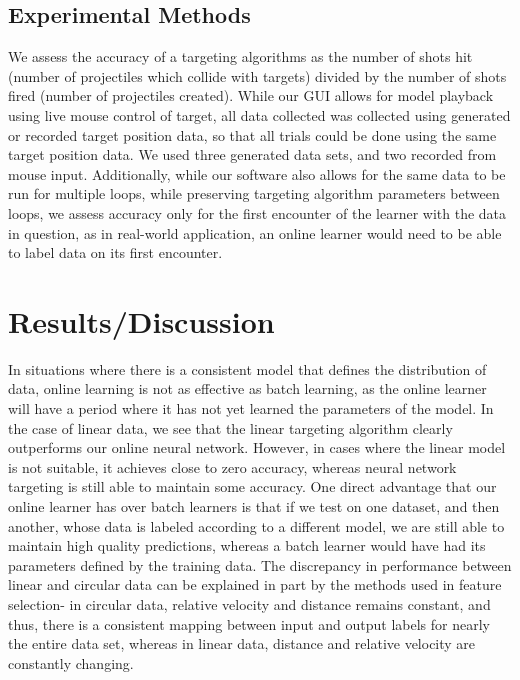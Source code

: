 \documentclass[11pt,letterpaper]{article}
\begin{document}
\subsection{Experimental Methods}
We assess the accuracy of a targeting algorithms as the number of shots hit (number of projectiles which collide with targets) divided by the number of shots fired (number of projectiles created). While our GUI allows for model playback using live mouse control of target, all data collected was collected using generated or recorded target position data, so that all trials could be done using the same target position data. We used three generated data sets, and two recorded from mouse input. Additionally, while our software also allows for the same data to be run for multiple loops, while preserving targeting algorithm parameters between loops, we assess accuracy only for the first encounter of the learner with the data in question, as in real-world application, an online learner would need to be able to label data on its first encounter.

\section{Results/Discussion}
In situations where there is a consistent model that defines the distribution of data, online learning is not as effective as batch learning, as the online learner will have a period where it has not yet learned the parameters of the model. In the case of linear data, we see that the linear targeting algorithm clearly outperforms our online neural network. However, in cases where the linear model is not suitable, it achieves close to zero accuracy, whereas neural network targeting is still able to maintain some accuracy. One direct advantage that our online learner has over batch learners is that if we test on one dataset, and then another, whose data is labeled according to a different model, we are still able to maintain high quality predictions, whereas a batch learner would have had its parameters defined by the training data. The discrepancy in performance between linear and circular data can be explained in part by the methods used in feature selection- in circular data, relative velocity and distance remains constant, and thus, there is a consistent mapping between input and output labels for nearly the entire data set, whereas in linear data, distance and relative velocity are constantly changing.
\end{document}
